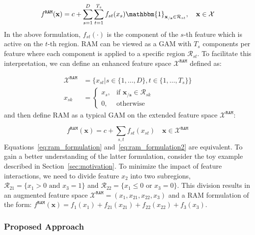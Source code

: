 \documentclass[12pt]{article}
\newcommand{\xb}{\mathbf{x}}
\newcommand{\xcc}{\mathbf{x_{/s}}}
\newcommand{\Xcal}{\mathcal{X}}
\newcommand{\when}[1]{\mathbbm{1}_{#1}}
\begin{document}
\begin{equation}
\label{eq:ram_formulation}
f^{\mathtt{RAM}}(\xb) = c + \sum_{s=1}^D \sum_{t=1}^{T_s} f_{st}(x_s) \when{\xcc \in \mathcal{R}_{st}}, \quad \xb \in \Xcal
\end{equation}
%
In the above formulation, \(f_{st}(\cdot)\) is the component of the \(s\)-th feature which is active on the \(t\)-th region.
RAM can be viewed as a GAM with \(T_s\) components per feature where each component is applied to a specific region \(\mathcal{R}_{st}\).
To facilitate this interpretation, we can define an enhanced feature space \(\Xcal^\mathtt{RAM}\) defined as:

\begin{equation}
\label{eq:ram_feature_space}
\begin{aligned}
\Xcal^{\mathtt{RAM}} &= \{x_{st} | s \in \{1, \ldots, D\}, t \in \{1, \ldots, T_s\}\} \\
x_{sk} &= \begin{cases}
x_s, & \text{if } \xcc \in \mathcal{R}_{sk} \\
0, & \text{otherwise}
\end{cases}
\end{aligned}
\end{equation}
%
and then define RAM as a typical GAM on the extended feature space \(\Xcal^{\mathtt{RAM}}\):

\begin{equation}
\label{eq:ram_formulation2}
f^{\mathtt{RAM}}(\xb) = c + \sum_{s,t} f_{st}(x_{st}) \quad \xb \in \Xcal^{\mathtt{RAM}}
\end{equation}
%
Equations~\ref{eq:ram_formulation} and~\ref{eq:ram_formulation2} are equivalent.
To gain a better understanding of the latter formulation, consider the toy example described in Section~\ref{sec:motivation}.
To minimize the impact of feature interactions, we need to divide feature \(x_2\) into two subregions,
\(\mathcal{R}_{21} = \{x_1 > 0 \text{ and } x_3 = 1\}\) and \(\mathcal{R}_{22} = \{x_1 \leq 0 \text{ or } x_3 = 0\}\).
This division results in an augmented feature space \(\Xcal^{\mathtt{RAM}} = (x_1, x_{21}, x_{22}, x_3)\)
and a RAM formulation of the form: \(f^{\mathtt{RAM}}(\xb) = f_1(x_1) + f_{21}(x_{21}) + f_{22}(x_{22}) + f_3(x_3)\).


\subsubsection{Proposed Approach}
\end{document}
